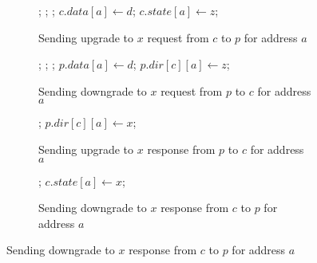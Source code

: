 \begin{figure}

\begin{subfigure}{\linewidth}
\begin{boxedminipage}{\linewidth}
\begin{algorithmic}
  \State \send{} ;
  \State \pop{} ;
    \State \pop{} ;
    \State $c.data[a] \gets d$;
  \EndIf
  \State $c.state[a] \gets z$;
\EndProc
\end{algorithmic}
\end{boxedminipage}
\caption{Sending upgrade to $x$ request from $c$ to $p$ for address $a$}
\label{uReqLocal}
\end{subfigure}

\begin{subfigure}{\linewidth}
\begin{boxedminipage}{\linewidth}
\begin{algorithmic}
  \State \send{} ;
  \State \pop{} ;
    \State \pop{} ;
    \State $p.data[a] \gets d$;
  \EndIf
  \State $p.dir[c][a] \gets z$;
\EndProc
\end{algorithmic}
\end{boxedminipage}
\caption{Sending downgrade to $x$ request from $p$ to $c$ for address $a$}
\label{dResp}
\end{subfigure}

\begin{subfigure}{\linewidth}
\begin{boxedminipage}{\linewidth}
\begin{algorithmic}
      \State \send{} ;
    \EndIf
    \State $p.dir[c][a] \gets x$;
  \EndIf
\EndProc
\end{algorithmic}
\end{boxedminipage}
\caption{Sending upgrade to $x$ response from $p$ to $c$ for address $a$}
\label{uResp}
\end{subfigure}

\begin{subfigure}{\linewidth}
\begin{boxedminipage}{\linewidth}
\begin{algorithmic}
      \State \send{} ;
    \EndIf
    \State $c.state[a] \gets x$;
  \EndIf
\EndProc
\end{algorithmic}
\end{boxedminipage}
\caption{Sending downgrade to $x$ response from $c$ to $p$ for address $a$}
\label{dResp}
\end{subfigure}


\end{figure}
